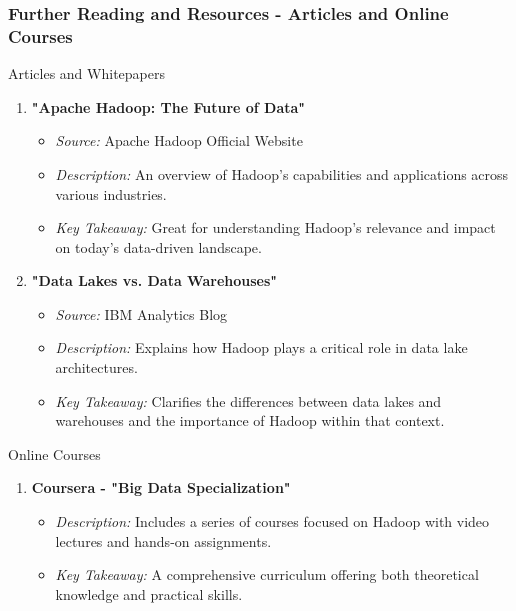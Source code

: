 \documentclass[aspectratio=169]{beamer}
\begin{document}
\begin{frame}[fragile]
    \frametitle{Further Reading and Resources - Articles and Online Courses}
    \begin{block}{Articles and Whitepapers}
        \begin{enumerate}
            \item \textbf{"Apache Hadoop: The Future of Data"}
            \begin{itemize}
                \item \textit{Source:} Apache Hadoop Official Website
                \item \textit{Description:} An overview of Hadoop’s capabilities and applications across various industries.
                \item \textit{Key Takeaway:} Great for understanding Hadoop’s relevance and impact on today’s data-driven landscape.
            \end{itemize}
            
            \item \textbf{"Data Lakes vs. Data Warehouses"}
            \begin{itemize}
                \item \textit{Source:} IBM Analytics Blog
                \item \textit{Description:} Explains how Hadoop plays a critical role in data lake architectures.
                \item \textit{Key Takeaway:} Clarifies the differences between data lakes and warehouses and the importance of Hadoop within that context.
            \end{itemize}
        \end{enumerate}
    \end{block}

    \begin{block}{Online Courses}
        \begin{enumerate}
            \item \textbf{Coursera - "Big Data Specialization"}
            \begin{itemize}
                \item \textit{Description:} Includes a series of courses focused on Hadoop with video lectures and hands-on assignments.
                \item \textit{Key Takeaway:} A comprehensive curriculum offering both theoretical knowledge and practical skills.
            \end{itemize}
            

\end{enumerate}
\end{block}
\end{frame}
\end{document}
